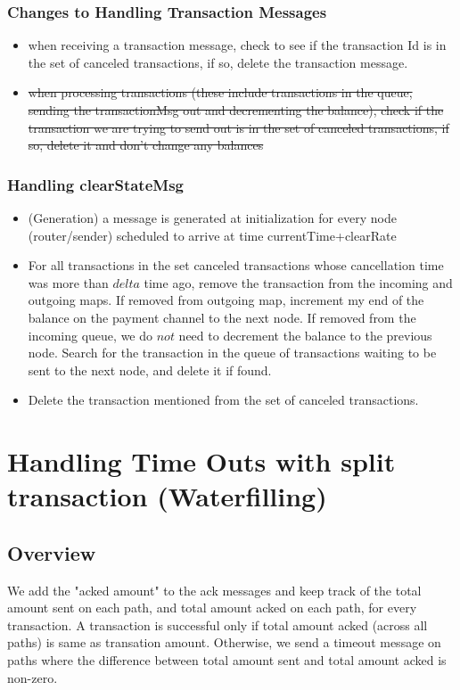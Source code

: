 \documentclass[a4paper]{article}
\begin{document}
\subsubsection{ Changes to Handling Transaction Messages}
    \begin{itemize}
        \item when receiving a transaction message, check to see if the transaction Id is in the set of canceled transactions, if so, delete the transaction message.
        \item \sout{ when processing transactions (these include transactions in the queue, sending the transactionMsg out and decrementing the balance), check if the transaction we are trying to send out is in the set of canceled transactions, if so, delete it and don’t change any balances}

    \end{itemize}
\subsubsection{ Handling clearStateMsg}
    \begin{itemize}
        \item (Generation) a message is generated at initialization for every node (router/sender) scheduled to arrive at time  currentTime+clearRate
        \item For all transactions in the set canceled transactions whose cancellation time  was more than $delta$ time ago, remove the transaction from the incoming and outgoing maps. If removed from outgoing map, increment my end of the balance on the payment channel to the next node. If removed from the incoming queue, we do $not$ need to decrement the balance to the previous node. Search for the transaction in the queue of transactions waiting to be sent to the next node, and delete it if found.
        \item Delete the transaction mentioned from the set of canceled transactions. 
    \end{itemize}

\section{Handling Time Outs with split transaction (Waterfilling)}
\subsection{Overview}
We add the "acked amount" to the ack messages and keep track of the total amount sent on each path, and total amount acked on each path, for every transaction. A transaction is successful only if total amount acked (across all paths) is same as transation amount. Otherwise, we send a timeout message on paths where the difference between total amount sent and total amount acked is non-zero.
\end{document}
